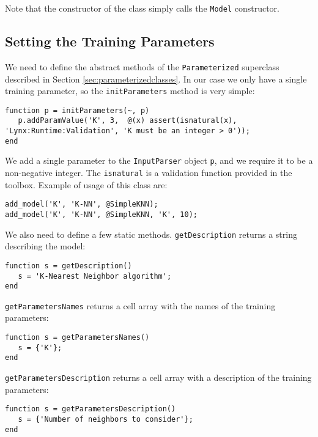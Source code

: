 \noindent Note that the constructor of the class simply calls the \verb|Model| constructor.

\subsection{Setting the Training Parameters}

We need to define the abstract methods of the \verb|Parameterized| superclass described in Section \ref{sec:parameterizedclasses}. In our case we only have a single training parameter, so the \verb|initParameters| method is very simple:

\begin{lstlisting}
function p = initParameters(~, p)
   p.addParamValue('K', 3,  @(x) assert(isnatural(x), 'Lynx:Runtime:Validation', 'K must be an integer > 0'));
end
\end{lstlisting}

\noindent We add a single parameter to the \verb|InputParser| object \verb|p|, and we require it to be a non-negative integer. The \verb|isnatural| is a validation function provided in the toolbox. Example of usage of this class are:

\begin{lstlisting}
add_model('K', 'K-NN', @SimpleKNN);
add_model('K', 'K-NN', @SimpleKNN, 'K', 10);
\end{lstlisting}

\noindent We also need to define a few static methods. \verb|getDescription| returns a string describing the model:

\begin{lstlisting}
function s = getDescription()
   s = 'K-Nearest Neighbor algorithm';
end
\end{lstlisting}

\noindent \verb|getParametersNames| returns a cell array with the names of the training parameters:

\begin{lstlisting}
function s = getParametersNames()
   s = {'K'};
end
\end{lstlisting}

\noindent \verb|getParametersDescription| returns a cell array with a description of the training parameters:

\begin{lstlisting}
function s = getParametersDescription()
   s = {'Number of neighbors to consider'};
end
\end{lstlisting}

